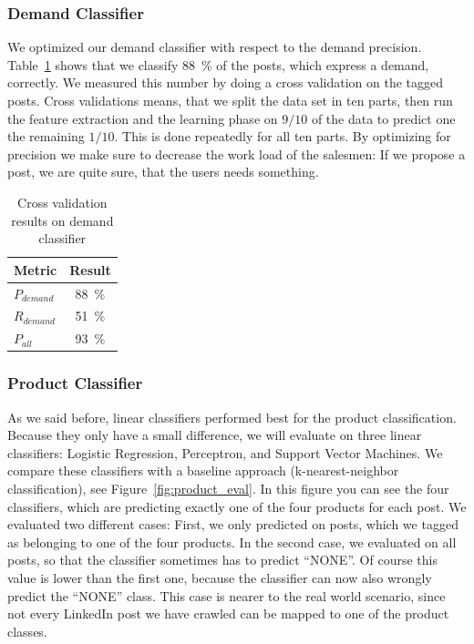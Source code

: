 \subsubsection{Demand Classifier}
\label{ssub:demand_classifier}

We optimized our demand classifier with respect to the demand precision.
Table~\ref{table:demand_evaluation} shows that we classify 88~\% of the posts, which express a demand, correctly.
We measured this number by doing a cross validation on the tagged posts.
Cross validations means, that we split the data set in ten parts, then run the feature extraction and the learning phase on $9 / 10$ of the data to predict one the remaining $1 / 10$.
This is done repeatedly for all ten parts.
By optimizing for precision we make sure to decrease the work load of the salesmen: If we propose a post, we are quite sure, that the users needs something.

\begin{table}[h]
	\centering
	\begin{tabular}{lc}
		\hline
		\textbf{Metric} & \textbf{Result}  \\
		\hline
		\hline
		$P_{demand}$ & 88~\% \\
		\hline
		$R_{demand}$ & 51~\%  \\
		\hline
		$P_{all}$ & 93~\%  \\
		\hline
	\end{tabular}
	\caption{Cross validation results on demand classifier}
	\label{table:demand_evaluation}
\end{table}

\subsubsection{Product Classifier}
\label{ssub:product_classifier}

As we said before, linear classifiers performed best for the product classification.
Because they only have a small difference, we will evaluate on three linear classifiers: Logistic Regression, Perceptron, and Support Vector Machines.
We compare these classifiers with a baseline approach (k-nearest-neighbor classification), see Figure~\ref{fig:product_eval}.
In this figure you can see the four classifiers, which are predicting exactly one of the four products for each post.
We evaluated two different cases:
First, we only predicted on posts, which we tagged as belonging to one of the four products.
In the second case, we evaluated on all posts, so that the classifier sometimes has to predict ``NONE''.
Of course this value is lower than the first one, because the classifier can now also wrongly predict the ``NONE'' class.
This case is nearer to the real world scenario, since not every LinkedIn post we have crawled can be mapped to one of the product classes.

